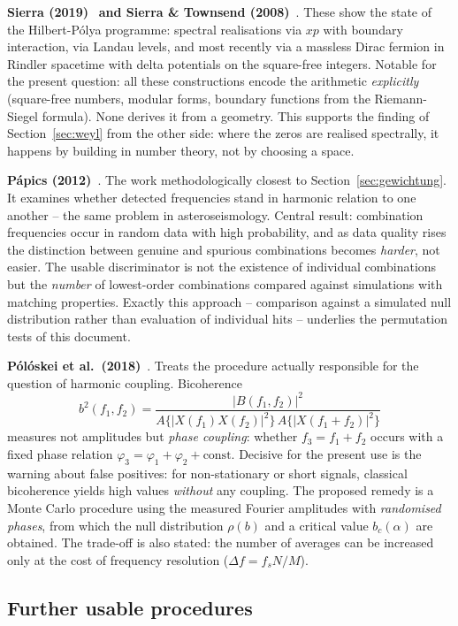 \textbf{Sierra (2019)}~\cite{sierra2019} \textbf{and Sierra \& Townsend
(2008)}~\cite{sierra2008}. These show the state of the Hilbert-P\'olya programme:
spectral realisations via $xp$ with boundary interaction, via Landau
levels, and most recently via a massless Dirac fermion in Rindler
spacetime with delta potentials on the square-free integers. Notable
for the present question: all these constructions encode the arithmetic
\emph{explicitly} (square-free numbers, modular forms, boundary
functions from the Riemann-Siegel formula). None derives it from a
geometry. This supports the finding of Section~\ref{sec:weyl} from the
other side: where the zeros are realised spectrally, it happens by
building in number theory, not by choosing a space.

\textbf{P\'apics (2012)}~\cite{papics2012}. The work
methodologically closest to Section~\ref{sec:gewichtung}. It examines
whether detected frequencies stand in harmonic relation to one
another -- the same problem in asteroseismology. Central result:
combination frequencies occur in random data with high probability, and
as data quality rises the distinction between genuine and spurious
combinations becomes \emph{harder}, not easier. The usable
discriminator is not the existence of individual combinations but the
\emph{number} of lowest-order combinations compared against simulations
with matching properties. Exactly this approach -- comparison against a
simulated null distribution rather than evaluation of individual hits
-- underlies the permutation tests of this document.

\textbf{P\'ol\'oskei et al.\ (2018)}~\cite{poloskei2018}. Treats the
procedure actually responsible for the question of harmonic coupling.
Bicoherence
\[
  b^2(f_1,f_2) = \frac{|B(f_1,f_2)|^2}
  {A\{|X(f_1)X(f_2)|^2\}\,A\{|X(f_1{+}f_2)|^2\}}
\]
measures not amplitudes but \emph{phase coupling}: whether
$f_3 = f_1 + f_2$ occurs with a fixed phase relation
$\varphi_3 = \varphi_1 + \varphi_2 + \text{const}$. Decisive for the
present use is the warning about false positives: for non-stationary or
short signals, classical bicoherence yields high values \emph{without}
any coupling. The proposed remedy is a Monte Carlo procedure using the
measured Fourier amplitudes with \emph{randomised phases}, from which
the null distribution $\rho(b)$ and a critical value $b_c(\alpha)$ are
obtained. The trade-off is also stated: the number of averages can be
increased only at the cost of frequency resolution
($\Delta f = f_s N/M$).

\subsection{Further usable procedures}

